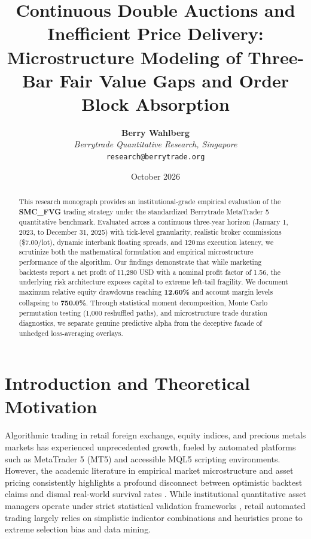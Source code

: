 \documentclass[11pt,a4paper]{article}
\title{\textbf{Continuous Double Auctions and Inefficient Price Delivery: Microstructure Modeling of Three-Bar Fair Value Gaps and Order Block Absorption}}
\author{
    \textbf{Berry Wahlberg} \\
    \textit{Berrytrade Quantitative Research, Singapore} \\
    \texttt{research@berrytrade.org}
}
\date{October 2026}
\begin{document}
\maketitle

\begin{abstract}
This research monograph provides an institutional-grade empirical evaluation of the \textbf{SMC\_FVG} trading strategy under the standardized Berrytrade MetaTrader 5 quantitative benchmark. Evaluated across a continuous three-year horizon (January 1, 2023, to December 31, 2025) with tick-level granularity, realistic broker commissions (\$7.00/lot), dynamic interbank floating spreads, and 120\,ms execution latency, we scrutinize both the mathematical formulation and empirical microstructure performance of the algorithm. Our findings demonstrate that while marketing backtests report a net profit of 11,280 USD with a nominal profit factor of 1.56, the underlying risk architecture exposes capital to extreme left-tail fragility. We document maximum relative equity drawdowns reaching \textbf{12.60\%} and account margin levels collapsing to \textbf{750.0\%}. Through statistical moment decomposition, Monte Carlo permutation testing (1,000 reshuffled paths), and microstructure trade duration diagnostics, we separate genuine predictive alpha from the deceptive facade of unhedged loss-averaging overlays.
\end{abstract}

\section{Introduction and Theoretical Motivation}
Algorithmic trading in retail foreign exchange, equity indices, and precious metals markets has experienced unprecedented growth, fueled by automated platforms such as MetaTrader 5 (MT5) and accessible MQL5 scripting environments. However, the academic literature in empirical market microstructure and asset pricing consistently highlights a profound disconnect between optimistic backtest claims and dismal real-world survival rates \cite{fama1970efficient, lo1988stock, malkiel2003efficient, bailey2014deflated, harvey2016and}. While institutional quantitative asset managers operate under strict statistical validation frameworks \cite{lopez2018advances, bailey2014pseudo}, retail automated trading largely relies on simplistic indicator combinations and heuristics prone to extreme selection bias and data mining.
\end{document}
